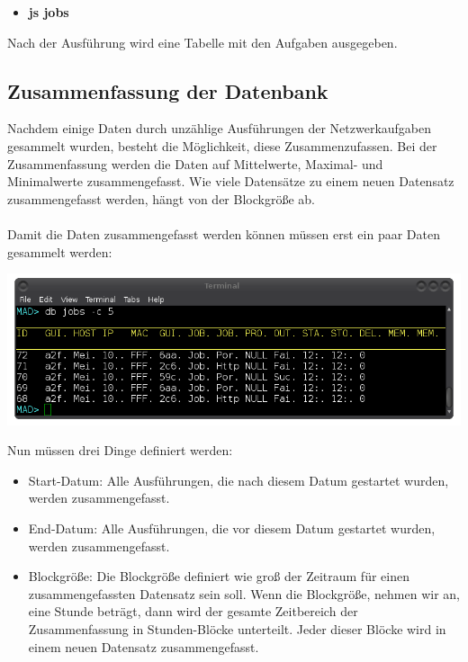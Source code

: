 \documentclass[12pt,a4paper]{report}
\begin{document}
\begin{onehalfspace}
\begin{itemize}
\item \textbf{js jobs}
\end{itemize}

Nach der Ausführung wird eine Tabelle mit den Aufgaben ausgegeben.

\subsection{Zusammenfassung der Datenbank}

Nachdem einige Daten durch unzählige Ausführungen der Netzwerkaufgaben gesammelt wurden, besteht die Möglichkeit, diese Zusammenzufassen. Bei der Zusammenfassung werden die Daten auf Mittelwerte, Maximal- und Minimalwerte zusammengefasst. Wie viele Datensätze zu einem neuen Datensatz zusammengefasst werden, hängt von der Blockgröße ab.\\\\
Damit die Daten zusammengefasst werden können müssen erst ein paar Daten gesammelt werden:

\begin{center}
\includegraphics[scale=0.6]{img/db_jobs2.png}
\end{center}

Nun müssen drei Dinge definiert werden:

\begin{itemize}
\item Start-Datum: Alle Ausführungen, die nach diesem Datum gestartet wurden, werden zusammengefasst.
\item End-Datum: Alle Ausführungen, die vor diesem Datum gestartet wurden, werden zusammengefasst.
\item Blockgröße: Die Blockgröße definiert wie groß der Zeitraum für einen zusammengefassten Datensatz sein soll. Wenn die Blockgröße, nehmen wir an, eine Stunde beträgt, dann wird der gesamte Zeitbereich der Zusammenfassung in Stunden-Blöcke unterteilt. Jeder dieser Blöcke wird in einem neuen Datensatz zusammengefasst.
\end{itemize}


\end{onehalfspace}
\end{document}
